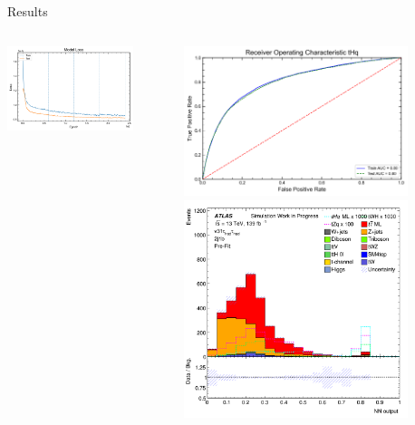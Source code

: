 \begin{frame}{Results}
    \begin{columns}
        \begin{column}{0.5\textwidth}
          \includegraphics[width=0.8\textwidth]{losses_cat}
        \end{column}
        \begin{column}{0.5\textwidth}
          \includegraphics[width=0.8\textwidth]{ROC_cat}
          \includegraphics[width=0.8\textwidth]{response_cat}
        \end{column}
    \end{columns}    
\end{frame}
